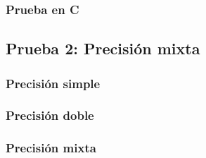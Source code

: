 \subsubsection{Prueba en C}


\newpage
\subsection{Prueba 2: Precisión mixta}
\label{prueba:mixta}
\subsubsection{Precisión simple}


\newpage
\subsubsection{Precisión doble}


\newpage
\subsubsection{Precisión mixta}
